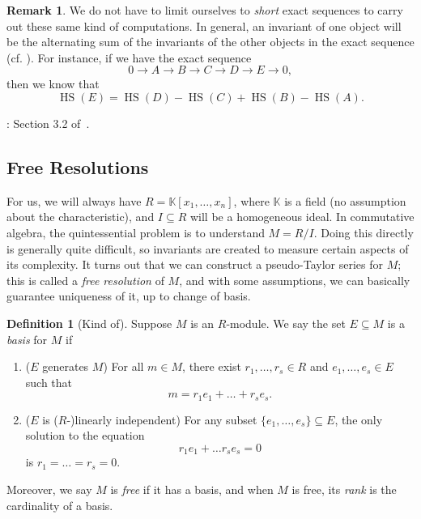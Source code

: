\documentclass[12pt,a4paper]{article}
\newcommand{\KK}{\mathbb{K}}
\DeclareMathOperator{\HS}{HS}
\theoremstyle{definition}
\newtheorem{definition}[theorem]{Definition}
\newtheorem{remark}[theorem]{Remark}
\numberwithin{equation}{section}
\begin{document}
\begin{remark}\label{remark: exact sequence invariants}
    We do not have to limit ourselves to \emph{short} exact sequences to carry out these same kind of computations.
    In general, an invariant of one object will be the alternating sum of the invariants of the other objects in the exact sequence (cf. ).
    For instance, if we have the exact sequence
    \begin{equation*}
        0 \longrightarrow A \longrightarrow B \longrightarrow C \longrightarrow D \longrightarrow E \longrightarrow 0,
    \end{equation*}
    then we know that
    \begin{equation*}
        \HS(E) = \HS(D) - \HS(C) + \HS(B) - \HS(A).
    \end{equation*}
\end{remark}

\vspace*{1cm}

: Section 3.2 of~\cite{schenck_computational_2003}.

\vspace*{1cm}


\subsection{Free Resolutions}
For us, we will always have $R = \KK[x_1,\dots,x_n]$, where $\KK$ is a field (no assumption about the characteristic), and $I \subseteq R$ will be a homogeneous ideal.
In commutative algebra, the quintessential problem is to understand $M = R/I$.
Doing this directly is generally quite difficult, so invariants are created to measure certain aspects of its complexity.
It turns out that we can construct a pseudo-Taylor series for $M$; this is called a \emph{free resolution} of $M$, and with some assumptions, we can basically guarantee uniqueness of it, up to change of basis.

\begin{definition}[Kind of]
    Suppose $M$ is an $R$-module.
    We say the set $E \subseteq M$ is a \emph{basis} for $M$ if
    \begin{enumerate}[label=(\arabic*)]
        \item ($E$ generates $M$) For all $m \in M$, there exist $r_1, \dots, r_s \in R$ and $e_1, \dots, e_s \in E$ such that
        \begin{equation*}
            m = r_1 e_1 + \dots + r_s e_s.
        \end{equation*}
        
        \item ($E$ is ($R$-)linearly independent) For any subset $\{ e_1, \dots, e_s \} \subseteq E$, the only solution to the equation
        \begin{equation*}
            r_1 e_1 + \dots r_s e_s = 0
        \end{equation*}
        is $r_1 = \dots = r_s = 0$.
    \end{enumerate}
    Moreover, we say $M$ is \emph{free} if it has a basis, and when $M$ is free, its \emph{rank} is the cardinality of a basis.
\end{definition}
\end{document}
